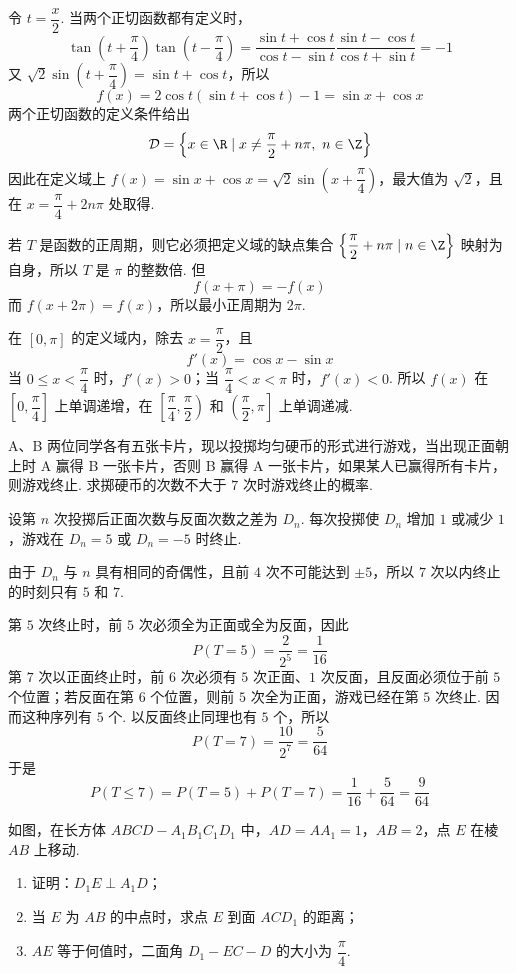 \begin{solution}
令 \(t=\dfrac x2\). 当两个正切函数都有定义时，
\[
\tan\left(t+\frac\pi4\right)\tan\left(t-\frac\pi4\right)
=\frac{\sin t+\cos t}{\cos t-\sin t}
 \frac{\sin t-\cos t}{\cos t+\sin t}=-1
\]
又 \(\sqrt2\sin\left(t+\dfrac\pi4\right)=\sin t+\cos t\)，所以
\[
f(x)=2\cos t(\sin t+\cos t)-1=\sin x+\cos x
\]
两个正切函数的定义条件给出
\[
\mathcal D=\left\{x\in\R\mid x\neq\frac\pi2+n\pi,\ n\in\Z\right\}
\]
因此在定义域上 \(f(x)=\sin x+\cos x=\sqrt2\sin\left(x+\dfrac\pi4\right)\)，最大值为 \(\sqrt2\)，且在 \(x=\dfrac\pi4+2n\pi\) 处取得.

若 \(T\) 是函数的正周期，则它必须把定义域的缺点集合 \(\left\{\dfrac\pi2+n\pi\mid n\in\Z\right\}\) 映射为自身，所以 \(T\) 是 \(\pi\) 的整数倍. 但
\[
f(x+\pi)=-f(x)
\]
而 \(f(x+2\pi)=f(x)\)，所以最小正周期为 \(2\pi\).

在 \([0,\pi]\) 的定义域内，除去 \(x=\dfrac\pi2\)，且
\[
f'(x)=\cos x-\sin x
\]
当 \(0\leqslant x<\dfrac\pi4\) 时，\(f'(x)>0\)；当 \(\dfrac\pi4<x<\pi\) 时，\(f'(x)<0\). 所以 \(f(x)\) 在 \(\left[0,\dfrac\pi4\right]\) 上单调递增，在 \(\left[\dfrac\pi4,\dfrac\pi2\right)\) 和 \(\left(\dfrac\pi2,\pi\right]\) 上单调递减.
\end{solution}

\begin{problem}
A、B 两位同学各有五张卡片，现以投掷均匀硬币的形式进行游戏，当出现正面朝上时 A 赢得 B 一张卡片，否则 B 赢得 A 一张卡片，如果某人已赢得所有卡片，则游戏终止. 求掷硬币的次数不大于 \(7\) 次时游戏终止的概率.
\end{problem}

\begin{solution}
设第 \(n\) 次投掷后正面次数与反面次数之差为 \(D_n\). 每次投掷使 \(D_n\) 增加 \(1\) 或减少 \(1\)，游戏在 \(D_n=5\) 或 \(D_n=-5\) 时终止.

由于 \(D_n\) 与 \(n\) 具有相同的奇偶性，且前 \(4\) 次不可能达到 \(\pm5\)，所以 \(7\) 次以内终止的时刻只有 \(5\) 和 \(7\).

第 \(5\) 次终止时，前 \(5\) 次必须全为正面或全为反面，因此
\[
P(T=5)=\frac{2}{2^5}=\frac1{16}
\]
第 \(7\) 次以正面终止时，前 \(6\) 次必须有 \(5\) 次正面、\(1\) 次反面，且反面必须位于前 \(5\) 个位置；若反面在第 \(6\) 个位置，则前 \(5\) 次全为正面，游戏已经在第 \(5\) 次终止. 因而这种序列有 \(5\) 个. 以反面终止同理也有 \(5\) 个，所以
\[
P(T=7)=\frac{10}{2^7}=\frac5{64}
\]
于是
\[
P(T\leqslant7)=P(T=5)+P(T=7)=\frac1{16}+\frac5{64}=\frac9{64}
\]
\end{solution}

\begin{problem}
如图，在长方体 \(ABCD-A_1B_1C_1D_1\) 中，\(AD=AA_1=1\)，\(AB=2\)，点 \(E\) 在棱 \(AB\) 上移动.

\begin{enumerate}
\item 证明：\(D_1E\perp A_1D\)；
\item 当 \(E\) 为 \(AB\) 的中点时，求点 \(E\) 到面 \(ACD_1\) 的距离；
\item \(AE\) 等于何值时，二面角 \(D_1-EC-D\) 的大小为 \(\dfrac\pi4\).
\end{enumerate}

\end{problem}

